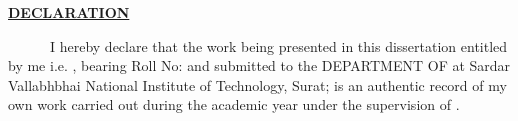 \newpage
\BgThispage{}
\begin{center}
    \textbf{\Large \underline{\textbf{DECLARATION}}}
\end{center}
\large

~~~~~~I hereby declare that the work being presented in this dissertation entitled \textbf{\MakeUppercase{\Title{}}} by me i.e. \textbf{\Atitle{} \Author{}}, bearing Roll No: \textbf{\MakeUppercase{\Rollno{}}}
and submitted to the DEPARTMENT OF \MakeUppercase{\Subject{}} at Sardar
Vallabhbhai National Institute of Technology, Surat; is an authentic
record of my own work carried out during the academic year \Year{} under the supervision of .
\vspace{50pt}\\


